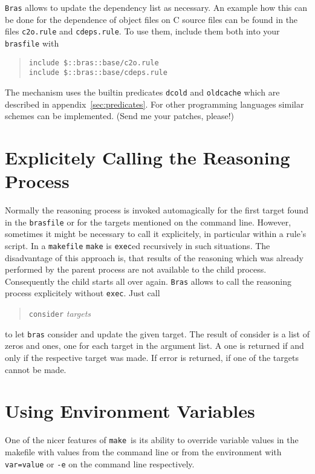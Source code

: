 \documentclass[11pt]{scrartcl}
\newcommand{\bras}{\texttt{bras}}
\newcommand{\Bras}{\texttt{Bras}}
\newcommand{\make}{\texttt{make}}
\newcommand{\brasfile}{\texttt{brasfile}}
\begin{document}
\Bras{} allows to update the dependency list as necessary. An example
how this can be done for the dependence of object files on C source
files can be found in the files \texttt{c2o.rule} and
\texttt{cdeps.rule}. To use them, include them both into your
\brasfile{} with
\begin{quote}
  \verb|include $::bras::base/c2o.rule|\\
  \verb|include $::bras::base/cdeps.rule|
\end{quote}
The mechanism uses the builtin predicates \texttt{dcold} and
\texttt{oldcache} which are described in
appendix~\ref{sec:predicates}. For other programming languages similar
schemes can be implemented. (Send me your patches, please!)

\section{Explicitely Calling the Reasoning Process}
\label{secConsider}

Normally the reasoning process is invoked automagically for the first
target found in the \brasfile{} or for the targets mentioned on the
command line. However, sometimes it might be necessary to call it
explicitely, in particular within a rule's script. In a
\texttt{makefile} \make{} is \texttt{exec}ed recursively in such
situations. The disadvantage of this approach is, that results of
the reasoning which was already performed by the parent process are not
available to the child process. Consequently the child starts all over
again. \Bras{} allows to call the reasoning process explicitely
without \texttt{exec}. Just call

\begin{quote}
  \texttt{consider} \textit{targets}
\end{quote}

to let \bras{} consider and update the given target. The result of 
consider is a list of zeros and ones, one for each target in the
argument list. A one is returned if and only if the respective target
was made. If error is returned, if one of the targets cannot be made.

\section{Using Environment Variables}
One of the nicer features of \make\ is its ability to override
variable values in the makefile with values from the command line or
from the environment with \texttt{var=value} or \texttt{-e}
on the command line respectively. 
\end{document}
